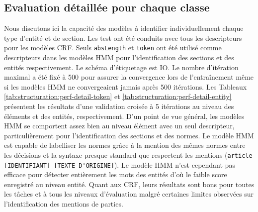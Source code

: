 \subsection{Evaluation détaillée pour chaque classe}
Nous discutons ici la capacité des modèles à identifier individuellement chaque type d'entité et de section. Les test ont été conduits avec tous les descripteurs pour les modèles CRF. Seuls \verb|absLength| et \verb|token| ont été utilisé comme descripteurs dans les modèles HMM pour l'identification des sections et des entités respectivement. Le schéma d'étiquetage est IO. Le nombre d'itération maximal a été fixé à 500 pour assurer la convergence lors de l'entraînement même si les modèles HMM ne convergeaient jamais après 500 itérations. Les Tableaux \ref{tab:structuration:perf-detail-token} et \ref{tab:structuration:perf-detail-entity} présentent les résultats d'une validation croisée à 5 itérations au niveau des éléments et des entités, respectivement. D'un point de vue général, les modèles HMM se comportent assez bien au niveau élément avec un seul descripteur, particulièrement pour l'identification des sections et des normes. Le modèle HMM est capable de labelliser les normes grâce à la mention des mêmes normes entre les décisions et la syntaxe presque standard que respectent les mentions (\verb|article [IDENTIFIANT] [TEXTE D'ORIGINE]|). Le modèle HMM n'est cependant pas efficace pour détecter entièrement les mots des entités d'où le faible score enregistré au niveau entité. Quant aux CRF, leurs résultats sont bons pour toutes les tâches et à tous les niveaux d'évaluation malgré certaines limites observées sur l'identification des mentions de parties.
